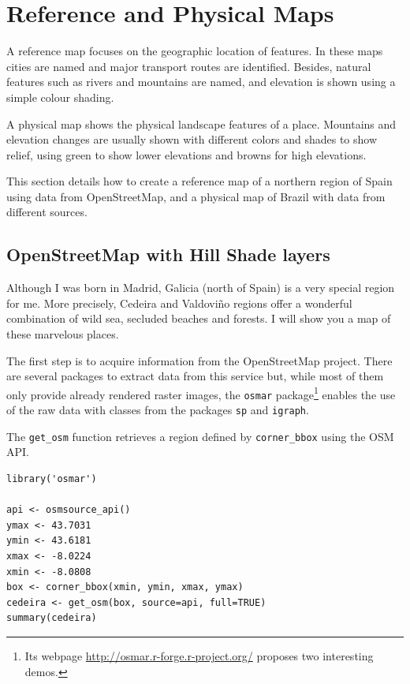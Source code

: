

\section{Reference and Physical Maps}
\label{sec-1}

\label{sec:referenceMaps}

A reference map focuses on the geographic location of features. In
these maps cities are named and major transport routes are
identified. Besides, natural features such as rivers and mountains are
named, and elevation is shown using a simple colour shading.  

A physical map shows the physical landscape features of a
place. Mountains and elevation changes are usually shown with
different colors and shades to show relief, using green to show
lower elevations and browns for high elevations.

This section details how to create a reference map of a northern
region of Spain using data from OpenStreetMap, and a physical map
of Brazil with data from different sources.
\subsection{OpenStreetMap with Hill Shade layers}
\label{sec-1-1}


Although I was born in Madrid, Galicia (north of Spain) is a very
special region for me. More precisely, Cedeira and Valdoviño
regions offer a wonderful combination of wild sea, secluded
beaches and forests. I will show you a map of these marvelous
places.

The first step is to acquire information from the OpenStreetMap
project. There are several packages to extract data from this
service but, while most of them only provide already rendered
raster images, the \texttt{osmar} package\footnote{Its webpage \href{http://osmar.r-forge.r-project.org/}{http://osmar.r-forge.r-project.org/} proposes
  two interesting demos.
 } enables the use of the raw data
with classes from the packages \texttt{sp} and \texttt{igraph}.

The \texttt{get\_osm} function retrieves a region defined by \texttt{corner\_bbox}
using the OSM API.


\lstset{language=R}
\begin{lstlisting}
library('osmar')

api <- osmsource_api()
ymax <- 43.7031
ymin <- 43.6181
xmax <- -8.0224
xmin <- -8.0808
box <- corner_bbox(xmin, ymin, xmax, ymax)
cedeira <- get_osm(box, source=api, full=TRUE)
summary(cedeira)
\end{lstlisting}



